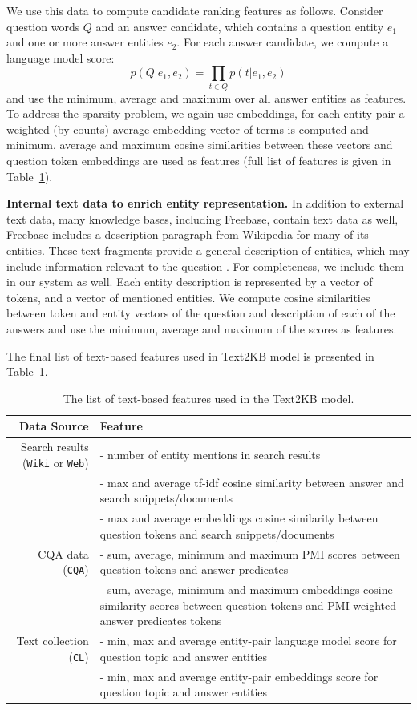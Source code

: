 We use this data to compute candidate ranking features as follows.
Consider question words $Q$ and an answer candidate, which contains a question entity $e_1$ and one or more answer entities $e_2$.
For each answer candidate, we compute a language model score:
$$p(Q|e_1, e_2) = \prod_{t\in Q} p(t | e_1, e_2)$$
and use the minimum, average and maximum over all answer entities as features.
To address the sparsity problem, we again use embeddings, 
\ie for each entity pair a weighted (by counts) average embedding vector of terms is computed and minimum, average and maximum cosine similarities between these vectors and question token embeddings are used as features (full list of features is given in Table~\ref{table:factoid:text2kb:features}).

\textbf{Internal text data to enrich entity representation.}
In addition to external text data, many knowledge bases, including Freebase, contain text data as well, \eg Freebase includes a description paragraph from Wikipedia for many of its entities.
These text fragments provide a general description of entities, which may include information relevant to the question \cite{Sun:2015:ODQ:2736277.2741651}.
For completeness, we include them in our system as well.
Each entity description is represented by a vector of tokens, and a vector of mentioned entities.
We compute cosine similarities between token and entity vectors of the question and description of each of the answers and use the minimum, average and maximum of the scores as features.

The final list of text-based features used in Text2KB model is presented in Table~\ref{table:factoid:text2kb:features}.

\begin{table}[h!]
\centering
\small
\begin{tabular}{r|p{8cm}}
Data Source & Feature\\
\hline
Search results (\texttt{Wiki} or \texttt{Web}) & - number of entity mentions in search results \\
 & - max and average tf-idf cosine similarity between answer and search snippets/documents \\
 & - max and average embeddings cosine similarity between question tokens and search snippets/documents \\
CQA data (\texttt{CQA}) & - sum, average, minimum and maximum PMI scores between question tokens and answer predicates \\
 & - sum, average, minimum and maximum embeddings cosine similarity scores between question tokens and PMI-weighted answer predicates tokens \\
Text collection (\texttt{CL}) & - min, max and average entity-pair language model score for question topic and answer entities \\
 & - min, max and average entity-pair embeddings score for question topic and answer entities \\
\end{tabular}
\caption{The list of text-based features used in the Text2KB model.}
\label{table:factoid:text2kb:features}
\end{table}

